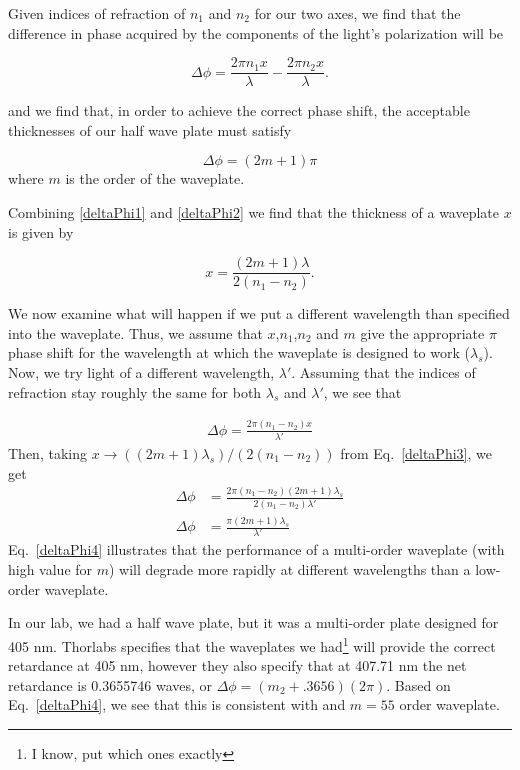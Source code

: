 Given indices of refraction of $n_1$ and $n_2$ for our two axes, we find that the difference in phase acquired by the components of the light's polarization will be 

\begin{equation}
\Delta \phi=\frac{2 \pi n_1 x}{\lambda} -\frac{2 \pi n_2 x}{\lambda}. \label{deltaPhi2}
\end{equation}

and we find that, in order to achieve the correct phase shift, the acceptable thicknesses of our half wave plate must satisfy

\begin{equation}
  \Delta \phi=(2m+1)\pi \label{deltaPhi1}
\end{equation}
where $m$ is the order of the waveplate.

Combining \ref{deltaPhi1} and \ref{deltaPhi2} we find that the thickness of a waveplate $x$ is given by

\begin{equation}
x=\frac{(2m+1) \lambda}{2 (n_1-n_2)}. \label{deltaPhi3}
\end{equation}


We now examine what will happen if we put a different wavelength than specified into the waveplate. Thus, we assume that $x$,$n_1$,$n_2$ and $m$ give the appropriate $\pi$ phase shift for the wavelength at which the waveplate is designed to work ($\lambda_s$). Now, we try light of a different wavelength, $\lambda'$. Assuming that the indices of refraction stay roughly the same for both $\lambda_s$ and $\lambda'$, we see that 

\begin{align}
\Delta \phi=\frac{2 \pi (n_1-n_2) x}{\lambda'} 
\end{align}
Then, taking $x\rightarrow ((2m+1) \lambda_s)/(2 (n_1-n_2))$ from Eq.\ \ref{deltaPhi3}, we get 
\begin{align}
\Delta \phi&=\frac{2 \pi (n_1-n_2) (2m+1) \lambda_s}{2 (n_1-n_2)\lambda'} \\
\Delta \phi&=\frac{\pi (2m+1) \lambda_s}{\lambda'} \label{deltaPhi4}
\end{align}
Eq.\ \ref{deltaPhi4} illustrates that the performance of a multi-order waveplate (with high value for $m$) will degrade more rapidly at different wavelengths than a low-order waveplate. 

In our lab, we had a half wave plate, but it was a multi-order plate designed for 405 nm. Thorlabs specifies that the waveplates we had\footnote{I know, put which ones exactly} will provide the correct retardance at 405 nm, however they also specify that at 407.71 nm the net retardance is 0.3655746 waves, or $\Delta \phi=(m_2+.3656) (2 \pi)$. Based on Eq.\ \ref{deltaPhi4}, we see that this is consistent with and $m=55$ order waveplate. 

